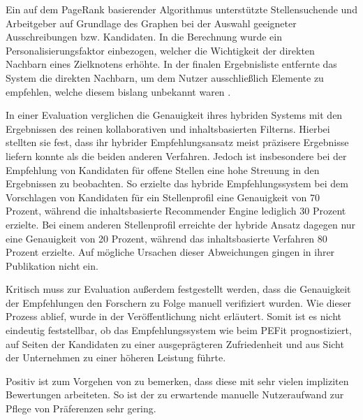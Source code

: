 Ein auf dem PageRank basierender Algorithmus unterstützte Stellensuchende und Arbeitgeber auf Grundlage des Graphen bei der Auswahl geeigneter Ausschreibungen bzw. Kandidaten. In die Berechnung wurde ein Personalisierungsfaktor einbezogen, welcher die Wichtigkeit der direkten Nachbarn eines Zielknotens erhöhte. In der finalen Ergebnisliste entfernte das System die direkten Nachbarn, um dem Nutzer ausschließlich Elemente zu empfehlen, welche diesem bislang unbekannt waren \cite[S. 3]{lu:2013}.

In einer Evaluation verglichen \textcite[S. 3f.]{lu:2013} die Genauigkeit ihres hybriden Systems mit den Ergebnissen des reinen kollaborativen und inhaltsbasierten Filterns. Hierbei stellten sie fest, dass ihr hybrider Empfehlungsansatz meist präzisere Ergebnisse liefern konnte als die beiden anderen Verfahren. Jedoch ist insbesondere bei der Empfehlung von Kandidaten für offene Stellen eine hohe Streuung in den Ergebnissen zu beobachten. So erzielte das hybride Empfehlungssystem bei dem Vorschlagen von Kandidaten für ein Stellenprofil eine Genauigkeit von 70 Prozent, während die inhaltsbasierte Recommender Engine lediglich 30 Prozent erzielte. Bei einem anderen Stellenprofil erreichte der hybride Ansatz dagegen nur eine Genauigkeit von 20 Prozent, während das inhaltsbasierte Verfahren 80 Prozent erzielte. Auf mögliche Ursachen dieser Abweichungen gingen \textcite[S. 1ff.]{lu:2013} in ihrer Publikation nicht ein.

Kritisch muss zur Evaluation außerdem festgestellt werden, dass die Genauigkeit der Empfehlungen den Forschern zu Folge manuell verifiziert wurden. Wie dieser Prozess ablief, wurde in der Veröffentlichung nicht erläutert. Somit ist es nicht eindeutig feststellbar, ob das Empfehlungssystem wie beim \ac{PEFit} prognostiziert, auf Seiten der Kandidaten zu einer ausgeprägteren Zufriedenheit und aus Sicht der Unternehmen zu einer höheren Leistung führte.

Positiv ist zum Vorgehen von \textcite[S. 1ff.]{lu:2013} zu bemerken, dass diese mit sehr vielen impliziten Bewertungen arbeiteten. So ist der zu erwartende manuelle Nutzeraufwand zur Pflege von Präferenzen sehr gering.
